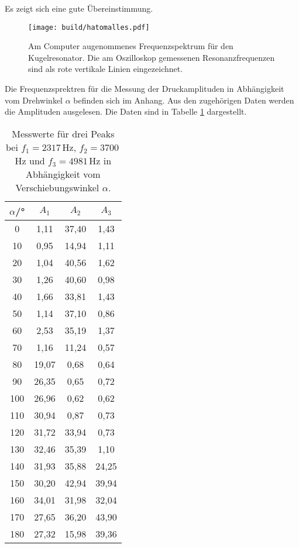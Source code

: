 Es zeigt sich eine gute Übereinstimmung.

\begin{figure}[h!]
  \centering
  \texttt{[image: build/hatomalles.pdf]}
  \caption{Am Computer augenommenes Frequenzspektrum für den Kugelresonator.
  Die am Oszilloskop gemessenen Resonanzfrequenzen sind als rote vertikale
  Linien eingezeichnet.}
  \label{fig:hatomalles}
\end{figure}


Die Frequenzsprektren für die Messung der Druckamplituden in Abhängigkeit vom
Drehwinkel $\alpha$ befinden sich im Anhang. Aus den zugehörigen Daten werden
die Amplituden ausgelesen. Die Daten sind in Tabelle \ref{tab:alpha} dargestellt.

\begin{table}[h!]
	\begin{center}
    \caption{Messwerte für drei Peaks bei $f_1=2317$\,Hz, $f_2=3700$\, Hz und
    $f_3=4981$\,Hz in Abhängigkeit vom Verschiebungswinkel $\alpha$.}
    \label{tab:alpha}
		\begin{tabular}{cccc}
		\toprule
			{$\alpha$/°} & {$A_1$} & {$A_2$} & {$A_3$}\\
			\midrule
			0 & 1,11 & 37,40 & 1,43\\
			10 & 0,95 & 14,94 & 1,11\\
			20 & 1,04 & 40,56 & 1,62\\
			30 & 1,26 & 40,60 & 0,98\\
			40 & 1,66 & 33,81 & 1,43\\
			50 & 1,14 & 37,10 & 0,86\\
			60 & 2,53 & 35,19 & 1,37\\
			70 & 1,16 & 11,24 & 0,57\\
			80 & 19,07 & 0,68 & 0,64\\
			90 & 26,35 & 0,65 & 0,72\\
			100 & 26,96 & 0,62 & 0,62\\
			110 & 30,94 & 0,87 & 0,73\\
			120 & 31,72 & 33,94 & 0,73\\
			130 & 32,46 & 35,39 & 1,10\\
			140 & 31,93 & 35,88 & 24,25\\
			150 & 30,20 & 42,94 & 39,94\\
			160 & 34,01 & 31,98 & 32,04\\
			170 & 27,65 & 36,20 & 43,90\\
			180 & 27,32 & 15,98 & 39,36\\
		\bottomrule
		\end{tabular}
	\end{center}
\end{table}

